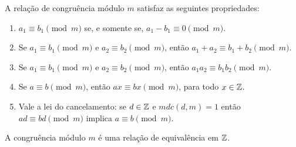 \documentclass{beamer}
\begin{document}
    \begin{frame}
        \begin{teorema}
            A relação de congruência módulo $m$ satisfaz as seguintes propriedades:\pause
            \begin{enumerate}[label={\roman*})]
                \item $a_{1}\equiv b_{1}\pmod{m}$ se, e somente se, $a_{1}-b_{1}\equiv 0\pmod{m}$.\pause \vspace{.3cm}

                \item Se $a_{1}\equiv b_{1}\pmod{m}$ e $a_{2}\equiv b_{2}\pmod{m}$, então $a_{1}+a_{2}\equiv b_{1}+b_{2}\pmod{m}$.\pause \vspace{.3cm}

                \item Se $a_{1}\equiv b_{1}\pmod{m}$ e $a_{2}\equiv b_{2}\pmod{m}$, então $a_{1}a_{2}\equiv b_{1}b_{2}\pmod{m}$.\label{item_provado}\pause \vspace{.3cm}

                \item Se $a\equiv b\pmod{m}$, então $ax\equiv bx\pmod{m}$, para todo $x \in \mathbb{Z}$.\pause \vspace{.3cm}

                \item Vale a lei do cancelamento: se $d \in \mathbb{Z}$ e $mdc(d,m) = 1$ então $ad \equiv bd \pmod{m}$ implica $a\equiv b \pmod{m}$.
            \end{enumerate}
        \end{teorema}
    \end{frame}

    \begin{frame}
        \begin{proposicao}
            A congruência módulo $m$ é uma relação de equivalência em $\mathbb{Z}$.
        \end{proposicao}
    \end{frame}
\end{document}
